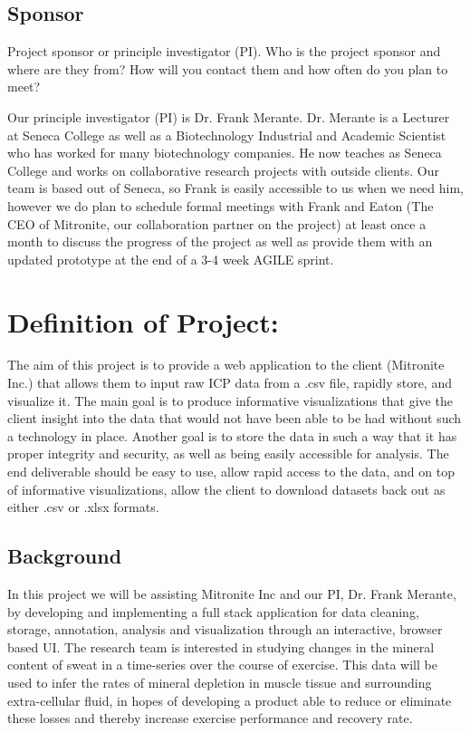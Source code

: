 \documentclass[10pt,twocolumn,letterpaper]{article}
\begin{document}
        \subsection{Sponsor}

        Project sponsor or principle investigator (PI).
	Who is the project sponsor and where are they from? 
	How will you contact them and how often do you plan to meet?

	Our principle investigator (PI) is Dr. Frank Merante. 
	Dr. Merante is a Lecturer at Seneca College as well as a Biotechnology Industrial and Academic Scientist who has worked for many biotechnology companies.
	He now teaches as Seneca College and works on collaborative research projects with outside clients. 
	Our team is based out of Seneca, so Frank is easily accessible to us when we need him, however we do plan to schedule formal meetings with Frank and Eaton (The CEO of
	Mitronite, our collaboration partner on the project) at least once a month to discuss the progress of the project as well as provide them with an updated prototype at the
	end of a 3-4 week AGILE sprint.
		
\section{Definition of Project:}
		
		The aim of this project is to provide a web application to the client (Mitronite Inc.) that allows them to input raw ICP data from a .csv file, rapidly store, and
		visualize it.
		The main goal is to produce informative visualizations that give the client insight into the data that would not have been able to be had without such a technology in
		place.
		Another goal is to store the data in such a way that it has proper integrity and security, as well as being easily accessible for analysis.
		The end deliverable should be easy to use, allow rapid access to the data, and on top of informative visualizations, allow the client to download datasets back out as
		either .csv or .xlsx formats.
		
            \subsection{Background}

            In this project we will be assisting Mitronite Inc and our PI, Dr. Frank Merante, by developing and implementing a full stack application for data cleaning, storage,
	    annotation, analysis and visualization through an interactive, browser based UI.
	    The research team is interested in studying changes in the mineral content of sweat in a time-series over the course of exercise. This data will be used to infer the
	    rates of mineral depletion in muscle tissue and surrounding extra-cellular fluid, in hopes of developing a product able to reduce or eliminate these losses and
	    thereby increase exercise performance and recovery rate.
\end{document}
